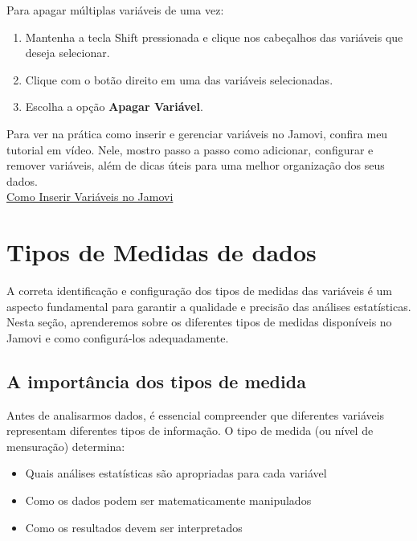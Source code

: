 Para apagar múltiplas variáveis de uma vez:
\begin{enumerate}
    \item Mantenha a tecla Shift pressionada e clique nos cabeçalhos das variáveis que deseja selecionar.
    \item Clique com o botão direito em uma das variáveis selecionadas.
    \item Escolha a opção \textbf{Apagar Variável}.
\end{enumerate}

\begin{tcolorbox}[colback=white,colframe=red,title={\faPlayCircle \ Dica de Conteúdo}]
  Para ver na prática como inserir e gerenciar variáveis no Jamovi, confira meu tutorial em vídeo. Nele, mostro passo a passo como adicionar, configurar e remover variáveis, além de dicas úteis para uma melhor organização dos seus dados.\\
  \textcolor{red}{\faYoutube} \href{https://youtu.be/UqEnetiHEns?si=qvTd5AucIA88QR3j}{Como Inserir Variáveis no Jamovi}
\end{tcolorbox}

\section{Tipos de Medidas de dados}

A correta identificação e configuração dos tipos de medidas das variáveis é um aspecto fundamental para garantir a qualidade e precisão das análises estatísticas. Nesta seção, aprenderemos sobre os diferentes tipos de medidas disponíveis no Jamovi e como configurá-los adequadamente.

\subsection{A importância dos tipos de medida}

Antes de analisarmos dados, é essencial compreender que diferentes variáveis representam diferentes tipos de informação. O tipo de medida (ou nível de mensuração) determina:

\begin{itemize}
    \item Quais análises estatísticas são apropriadas para cada variável
    \item Como os dados podem ser matematicamente manipulados
    \item Como os resultados devem ser interpretados
\end{itemize}

